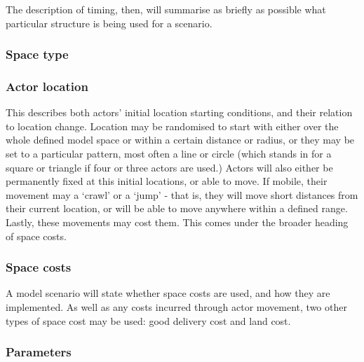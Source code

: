 The description of timing, then, will summarise as briefly as possible what particular structure is being used for a scenario. 


\subsubsection{Space type}


\subsubsection{Actor location}

This describes both actors' initial location starting conditions, and their relation to location change. Location may be randomised to start with either over the whole defined model space or within a certain distance or radius, or they may be set to a particular pattern, most often a line or circle (which stands in for a square or triangle if four or three actors are used.) Actors will also either be permanently fixed at this initial locations, or able to move. If mobile, their movement may a `crawl' or a `jump' - that is, they will move short distances from their current location, or will be able to move anywhere within a defined range. Lastly, these movements may cost them. This comes under the broader heading of space costs.

\subsubsection{Space costs}

A model scenario will state whether space costs are used, and how they are implemented. As well as any costs incurred through actor movement, two other types of space cost may be used: good delivery cost and land cost. 

\subsubsection{Parameters}

